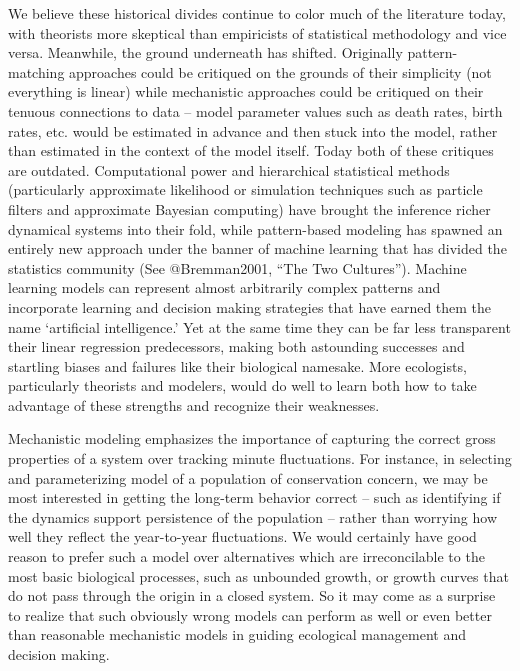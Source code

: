 \documentclass[author-year, review]{elsarticle} %
\begin{document}
We believe these historical divides continue to color much of the
literature today, with theorists more skeptical than empiricists of
statistical methodology and vice versa. Meanwhile, the ground underneath
has shifted. Originally pattern-matching approaches could be critiqued
on the grounds of their simplicity (not everything is linear) while
mechanistic approaches could be critiqued on their tenuous connections
to data -- model parameter values such as death rates, birth rates, etc.
would be estimated in advance and then stuck into the model, rather than
estimated in the context of the model itself. Today both of these
critiques are outdated. Computational power and hierarchical statistical
methods (particularly approximate likelihood or simulation techniques
such as particle filters and approximate Bayesian computing) have
brought the inference richer dynamical systems into their fold, while
pattern-based modeling has spawned an entirely new approach under the
banner of machine learning that has divided the statistics community
(See @Bremman2001, ``The Two Cultures''). Machine learning models can
represent almost arbitrarily complex patterns and incorporate learning
and decision making strategies that have earned them the name
`artificial intelligence.' Yet at the same time they can be far less
transparent their linear regression predecessors, making both astounding
successes and startling biases and failures like their biological
namesake. More ecologists, particularly theorists and modelers, would do
well to learn both how to take advantage of these strengths and
recognize their weaknesses.

Mechanistic modeling emphasizes the importance of capturing the correct
gross properties of a system over tracking minute fluctuations. For
instance, in selecting and parameterizing model of a population of
conservation concern, we may be most interested in getting the long-term
behavior correct -- such as identifying if the dynamics support
persistence of the population -- rather than worrying how well they
reflect the year-to-year fluctuations. We would certainly have good
reason to prefer such a model over alternatives which are irreconcilable
to the most basic biological processes, such as unbounded growth, or
growth curves that do not pass through the origin in a closed system. So
it may come as a surprise to realize that such obviously wrong models
can perform as well or even better than reasonable mechanistic models in
guiding ecological management and decision making.
\end{document}
